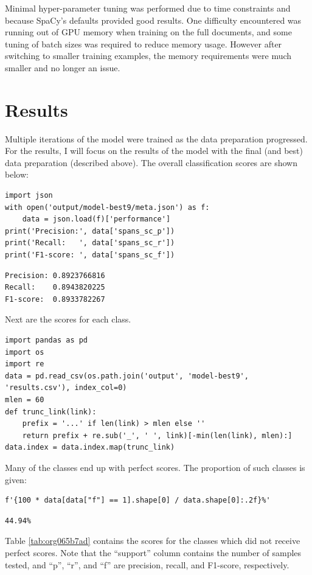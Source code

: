 \documentclass[manuscript,screen,review]{acmart}
\begin{document}
Minimal hyper-parameter tuning was performed due to time constraints
and because SpaCy's defaults provided good results. One difficulty
encountered was running out of GPU memory when training on the full
documents, and some tuning of batch sizes was required to reduce
memory usage. However after switching to smaller training examples,
the memory requirements were much smaller and no longer an issue.

\section*{Results}
\label{sec:org4c96a5c}
Multiple iterations of the model were trained as the data preparation
progressed. For the results, I will focus on the results of the model
with the final (and best) data preparation (described above). The
overall classification scores are shown below:

\begin{verbatim}
import json
with open('output/model-best9/meta.json') as f:
    data = json.load(f)['performance']
print('Precision:', data['spans_sc_p'])
print('Recall:   ', data['spans_sc_r'])
print('F1-score: ', data['spans_sc_f'])
\end{verbatim}

\begin{verbatim}
Precision: 0.8923766816
Recall:    0.8943820225
F1-score:  0.8933782267
\end{verbatim}


Next are the scores for each class.

\begin{verbatim}
import pandas as pd
import os
import re
data = pd.read_csv(os.path.join('output', 'model-best9', 'results.csv'), index_col=0)
mlen = 60
def trunc_link(link):
    prefix = '...' if len(link) > mlen else ''
    return prefix + re.sub('_', ' ', link)[-min(len(link), mlen):]
data.index = data.index.map(trunc_link)
\end{verbatim}

Many of the classes end up with perfect scores. The proportion of such
classes is given:

\begin{verbatim}
f'{100 * data[data["f"] == 1].shape[0] / data.shape[0]:.2f}%'
\end{verbatim}

\begin{verbatim}
44.94%
\end{verbatim}


Table \ref{tab:org065b7ad} contains the scores for the classes which did
not receive perfect scores. Note that the ``support'' column contains
the number of samples tested, and ``p'', ``r'', and ``f'' are precision,
recall, and F1-score, respectively.
\end{document}
